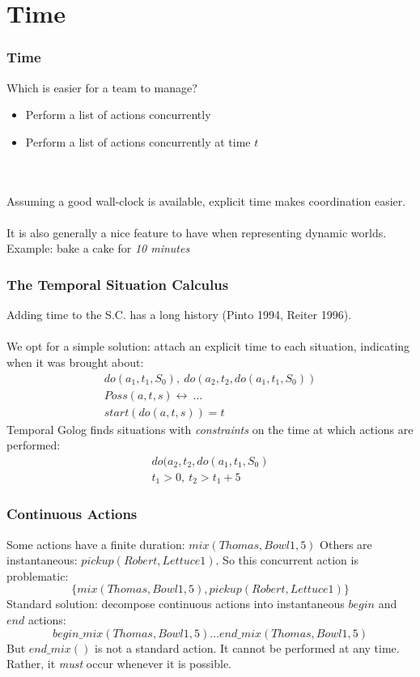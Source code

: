 \documentclass{beamer}
\begin{document}
\section{Time}

\begin{frame}
\frametitle{Time}
Which is easier for a team to manage?
\begin{itemize}
  \pause
  \item Perform a list of actions concurrently
  \pause
  \item Perform a list of actions concurrently at time $t$
\end{itemize}
\ \\
\ \\
\pause
Assuming a good wall-clock is available, explicit time makes coordination easier.\\
\ \\
It is also generally a nice feature to have when representing dynamic worlds.
Example: bake a cake for \emph{10 minutes}
\end{frame}

\begin{frame}
\frametitle{The Temporal Situation Calculus}
Adding time to the S.C. has a long history (Pinto 1994, Reiter 1996).\\
\ \\
We opt for a simple solution: attach an explicit time to each situation,
indicating when it was brought about:\[
\begin{array}{c}
do(a_1,t_1,S_0),\ do(a_2,t_2,do(a_1,t_1,S_0))\\
Poss(a,t,s) \leftrightarrow\ \dots\\
start(do(a,t,s)) = t
\end{array}\]
\pause
Temporal Golog finds situations with \emph{constraints} on the
time at which actions are performed:\[
\begin{array}{c}
do(a_2,t_2,do(a_1,t_1,S_0)\\
t_1>0,\ t_2>t_1+5
\end{array}\]
\end{frame}

\begin{frame}
\frametitle{Continuous Actions}
Some actions have a finite duration: $mix(Thomas,Bowl1,5)$
Others are instantaneous: $pickup(Robert,Lettuce1)$.
So this concurrent action is problematic:\[
\{mix(Thomas,Bowl1,5),pickup(Robert,Lettuce1)\}\]
Standard solution: decompose continuous actions into instantaneous $begin$ 
and $end$ actions:\[
begin\_mix(Thomas,Bowl1,5) \dots end\_mix(Thomas,Bowl1,5)\]
But $end\_mix()$ is not a standard action.  It cannot be performed at
any time.  Rather, it \emph{must} occur whenever it is possible.
\end{frame}
\end{document}
